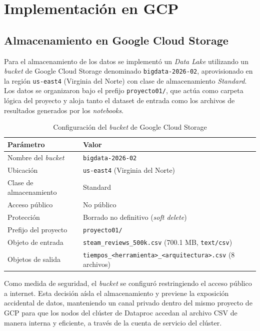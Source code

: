 \section{Implementación en GCP}

\subsection{Almacenamiento en Google Cloud Storage}
Para el almacenamiento de los datos se implementó un \textit{Data Lake} utilizando un \textit{bucket} de Google Cloud Storage denominado \texttt{bigdata-2026-02}, aprovisionado en la región \texttt{us-east4} (Virginia del Norte) con clase de almacenamiento \textit{Standard}. Los datos se organizaron bajo el prefijo \texttt{proyecto01/}, que actúa como carpeta lógica del proyecto y aloja tanto el dataset de entrada como los archivos de resultados generados por los \textit{notebooks}.

\begin{table}[H]
\centering
\caption{Configuración del \textit{bucket} de Google Cloud Storage}
\label{tab:bucket}
\vspace{0.2cm}
\small
\begin{tabular}{@{}lp{9.2cm}@{}}
\toprule
\textbf{Parámetro} & \textbf{Valor} \\
\midrule
Nombre del \textit{bucket}    & \texttt{bigdata-2026-02} \\
Ubicación                     & \texttt{us-east4} (Virginia del Norte) \\
Clase de almacenamiento       & Standard \\
Acceso público                & No público \\
Protección                    & Borrado no definitivo (\textit{soft delete}) \\
Prefijo del proyecto          & \texttt{proyecto01/} \\
Objeto de entrada             & \texttt{steam\_\bk{}reviews\_\bk{}500k.\bk{}csv} (700.1 MB, \texttt{text/csv}) \\
Objetos de salida             & \texttt{tiempos\_\bk{}<herramienta>\_\bk{}<arquitectura>.\bk{}csv} (8 archivos) \\
\bottomrule
\end{tabular}
\end{table}

Como medida de seguridad, el \textit{bucket} se configuró restringiendo el acceso público a internet. Esta decisión aísla el almacenamiento y previene la exposición accidental de datos, manteniendo un canal privado dentro del mismo proyecto de GCP para que los nodos del clúster de Dataproc accedan al archivo CSV de manera interna y eficiente, a través de la cuenta de servicio del clúster.


